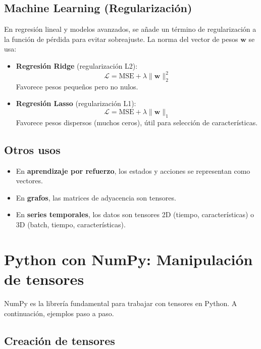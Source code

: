 \documentclass[12pt,a4paper,openany,oneside]{book}
\begin{document}
\subsection{Machine Learning (Regularización)}
En regresión lineal y modelos avanzados, se añade un término de regularización a la función de pérdida para evitar sobreajuste. La norma del vector de pesos $\mathbf{w}$ se usa:

\begin{itemize}
    \item \textbf{Regresión Ridge} (regularización L2):
    \begin{equation*}
    \mathcal{L} = \text{MSE} + \lambda \|\mathbf{w}\|_2^2
    \end{equation*}
    Favorece pesos pequeños pero no nulos.

    \item \textbf{Regresión Lasso} (regularización L1):
    \begin{equation*}
    \mathcal{L} = \text{MSE} + \lambda \|\mathbf{w}\|_1
    \end{equation*}
    Favorece pesos dispersos (muchos ceros), útil para selección de características.
\end{itemize}

\subsection{Otros usos}
\begin{itemize}
    \item En \textbf{aprendizaje por refuerzo}, los estados y acciones se representan como vectores.
    \item En \textbf{grafos}, las matrices de adyacencia son tensores.
    \item En \textbf{series temporales}, los datos son tensores 2D (tiempo, características) o 3D (batch, tiempo, características).
\end{itemize}

\section{Python con NumPy: Manipulación de tensores}

NumPy es la librería fundamental para trabajar con tensores en Python. A continuación, ejemplos paso a paso.

\subsection{Creación de tensores}
\end{document}
